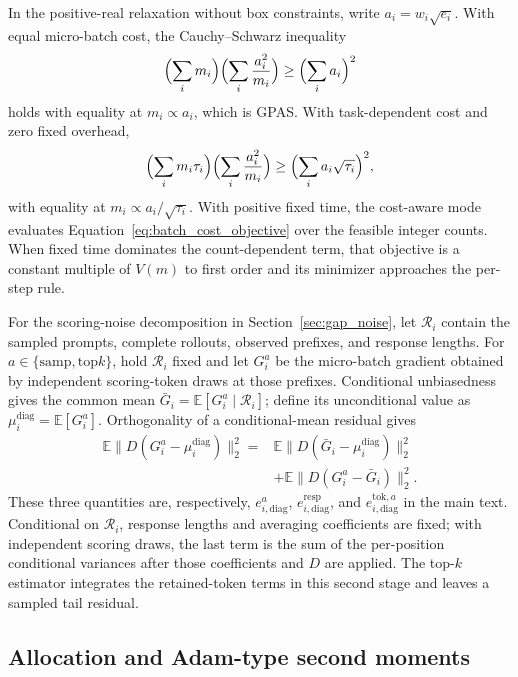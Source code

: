 In the positive-real relaxation without box constraints, write
$a_i=w_i\sqrt{e_i}$. With equal micro-batch cost, the Cauchy--Schwarz
inequality
\begin{equation}
\Bigl(\sum_i m_i\Bigr)\Bigl(\sum_i\frac{a_i^2}{m_i}\Bigr)
\geq\Bigl(\sum_i a_i\Bigr)^2
\end{equation}
holds with equality at $m_i\propto a_i$, which is GPAS. With task-dependent
cost and zero fixed overhead,
\begin{equation}
\Bigl(\sum_i m_i\tau_i\Bigr)\Bigl(\sum_i\frac{a_i^2}{m_i}\Bigr)
\geq\Bigl(\sum_i a_i\sqrt{\tau_i}\Bigr)^2,
\end{equation}
with equality at $m_i\propto a_i/\sqrt{\tau_i}$. With positive fixed time, the
cost-aware mode evaluates Equation~\ref{eq:batch_cost_objective} over the
feasible integer counts. When fixed time dominates the count-dependent term,
that objective is a constant multiple of $V(m)$ to first order and its
minimizer approaches the per-step rule.

For the scoring-noise decomposition in Section~\ref{sec:gap_noise}, let
$\mathcal R_i$ contain the sampled prompts, complete rollouts, observed
prefixes, and response lengths. For
$a\in\{\mathrm{samp},\mathrm{top}k\}$, hold $\mathcal R_i$ fixed and let
$G_i^a$ be the micro-batch gradient obtained by independent scoring-token
draws at those prefixes. Conditional unbiasedness gives the common mean
$\bar G_i=\mathbb E[G_i^a\mid\mathcal R_i]$; define its unconditional value as
$\mu_i^{\mathrm{diag}}=\mathbb E[G_i^a]$. Orthogonality of a
conditional-mean residual gives
\begin{equation*}
\begin{aligned}
\mathbb E\|D(G_i^a-\mu_i^{\mathrm{diag}})\|_2^2
={}&\mathbb E\|D(\bar G_i-\mu_i^{\mathrm{diag}})\|_2^2\\
 &+\mathbb E\|D(G_i^a-\bar G_i)\|_2^2.
\end{aligned}
\end{equation*}
These three quantities are, respectively, $e_{i,\mathrm{diag}}^a$,
$e_{i,\mathrm{diag}}^{\mathrm{resp}}$, and
$e_{i,\mathrm{diag}}^{\mathrm{tok},a}$ in the main text. Conditional on $\mathcal R_i$,
response lengths and averaging coefficients are fixed; with independent
scoring draws, the last term is the sum of the per-position conditional
variances after those coefficients and $D$ are applied. The top-$k$ estimator
integrates the retained-token terms in this second stage and leaves a sampled
tail residual.

\subsection{Allocation and Adam-type second moments}
\label{app:moment_target_proof}

